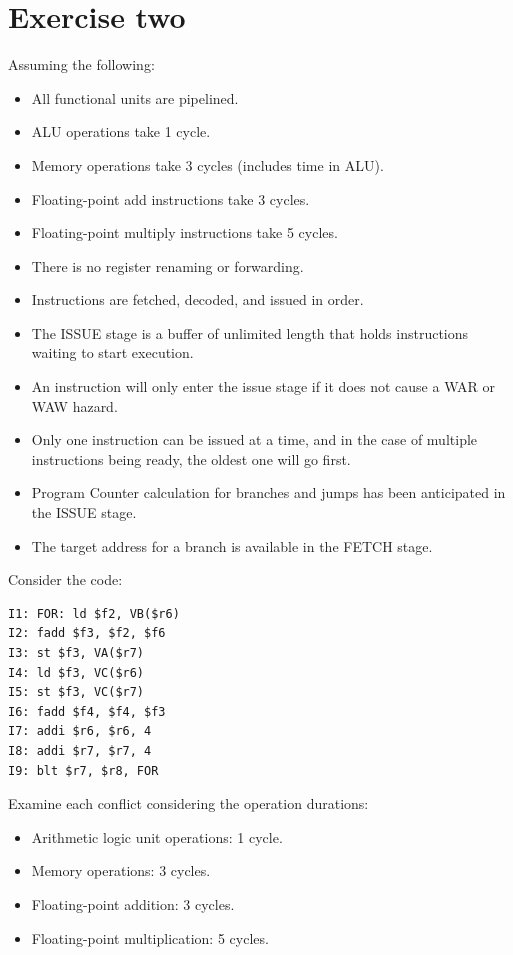 \section{Exercise two}

Assuming the following:
\begin{itemize}
    \item All functional units are pipelined.
    \item ALU operations take 1 cycle.
    \item Memory operations take 3 cycles (includes time in ALU).
    \item Floating-point add instructions take 3 cycles.
    \item Floating-point multiply instructions take 5 cycles.
    \item There is no register renaming or forwarding.
    \item Instructions are fetched, decoded, and issued in order.
    \item The ISSUE stage is a buffer of unlimited length that holds instructions waiting to start execution.
    \item An instruction will only enter the issue stage if it does not cause a WAR or WAW hazard.
    \item Only one instruction can be issued at a time, and in the case of multiple instructions being ready, the oldest one will go first.
    \item Program Counter calculation for branches and jumps has been anticipated in the ISSUE stage.
    \item The target address for a branch is available in the FETCH stage.
\end{itemize}
Consider the code:
\begin{verbatim}
I1: FOR: ld $f2, VB($r6)
I2: fadd $f3, $f2, $f6
I3: st $f3, VA($r7)
I4: ld $f3, VC($r6)
I5: st $f3, VC($r7)
I6: fadd $f4, $f4, $f3
I7: addi $r6, $r6, 4
I8: addi $r7, $r7, 4
I9: blt $r7, $r8, FOR
\end{verbatim}
Examine each conflict considering the operation durations:
\begin{itemize}
\item Arithmetic logic unit operations: 1 cycle.
\item Memory operations: 3 cycles.
\item Floating-point addition: 3 cycles.
\item Floating-point multiplication: 5 cycles.
\end{itemize}

